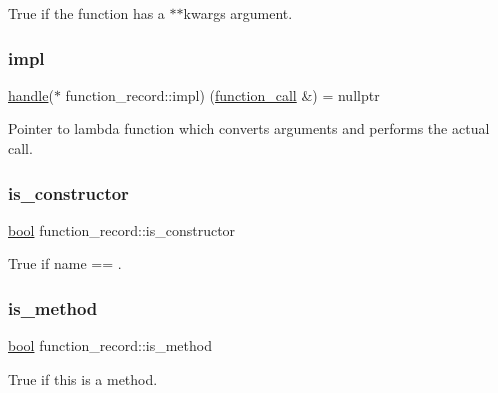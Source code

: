 True if the function has a \textquotesingle{}$\ast$$\ast$kwargs\textquotesingle{} argument. 

\mbox{\label{structfunction__record_a0e6a4fd6fef173a1958f8c14c6610ac9}} 
\subsubsection{\texorpdfstring{impl}{impl}}
{\footnotesize\ttfamily \mbox{\hyperlink{classhandle}{handle}}($\ast$ function\+\_\+record\+::impl) (\mbox{\hyperlink{structfunction__call}{function\+\_\+call}} \&) = nullptr}



Pointer to lambda function which converts arguments and performs the actual call. 

\mbox{\label{structfunction__record_aa014e3469d353ed93ffb67d626879a29}} 
\subsubsection{\texorpdfstring{is\_constructor}{is\_constructor}}
{\footnotesize\ttfamily \mbox{\hyperlink{asdl_8h_af6a258d8f3ee5206d682d799316314b1}{bool}} function\+\_\+record\+::is\+\_\+constructor}



True if name == \textquotesingle{}. 

\mbox{\label{structfunction__record_aaad664f057b3151927053a855ec3aea0}} 
\subsubsection{\texorpdfstring{is\_method}{is\_method}}
{\footnotesize\ttfamily \mbox{\hyperlink{asdl_8h_af6a258d8f3ee5206d682d799316314b1}{bool}} function\+\_\+record\+::is\+\_\+method}



True if this is a method. 


